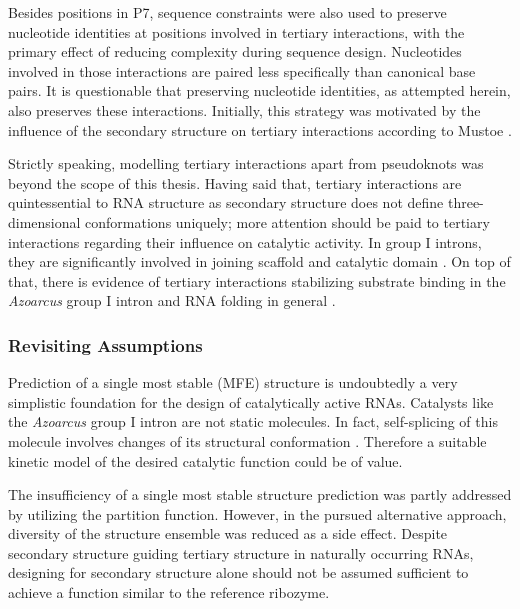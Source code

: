 \documentclass[../../master.tex]{subfiles}
\begin{document}
Besides positions in P7, sequence constraints were also used to preserve nucleotide identities at positions involved in tertiary interactions, with the primary effect of reducing complexity during sequence design.
Nucleotides involved in those interactions are paired less specifically than canonical base pairs. 
It is questionable that preserving nucleotide identities, as attempted herein, also preserves these interactions.
Initially, this strategy was motivated by the influence of the secondary structure on tertiary interactions according to Mustoe \parencite{mustoe_secondary_2016}.

Strictly speaking, modelling tertiary interactions apart from pseudoknots was beyond the scope of this thesis.
Having said that, tertiary interactions are quintessential to RNA structure as secondary structure does not define three-dimensional conformations uniquely; more attention should be paid to tertiary interactions regarding their influence on catalytic activity.
In group I introns, they are significantly involved in joining scaffold and catalytic domain \parencite{tanner_joining_1997}.
On top of that, there is evidence of tertiary interactions stabilizing substrate binding in the \textit{Azoarcus} group I intron and RNA folding in general \parencite{gleitsman_kinetic_2014, chauhan_tertiary_2008}.



\subsubsection{Revisiting Assumptions}
\label{ssub:discussion:assumptions}

Prediction of a single most stable (MFE) structure is undoubtedly a very simplistic foundation for the design of catalytically active RNAs.
Catalysts like the \textit{Azoarcus} group I intron are not static molecules. 
In fact, self-splicing of this molecule involves changes of its structural conformation \parencite{adams_crystal_2004-1, gleitsman_kinetic_2014}.
Therefore a suitable kinetic model of the desired catalytic function could be of value.

The insufficiency of a single most stable structure prediction was partly addressed by utilizing the partition function.
However, in the pursued alternative approach, diversity of the structure ensemble was reduced as a side effect.
Despite secondary structure guiding tertiary structure in naturally occurring RNAs, designing for secondary structure alone should not be assumed sufficient to achieve a function similar to the reference ribozyme.
\end{document}

